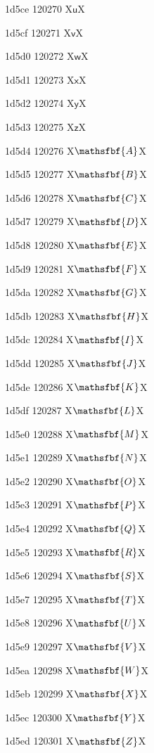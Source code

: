 \documentclass[11pt]{article}
\begin{document}
1d5ce 120270 X{\ensuremath{\mathsf{u}}}X

1d5cf 120271 X{\ensuremath{\mathsf{v}}}X

1d5d0 120272 X{\ensuremath{\mathsf{w}}}X

1d5d1 120273 X{\ensuremath{\mathsf{x}}}X

1d5d2 120274 X{\ensuremath{\mathsf{y}}}X

1d5d3 120275 X{\ensuremath{\mathsf{z}}}X

1d5d4 120276 X{\ensuremath{\mathsfbf{A}}}X

1d5d5 120277 X{\ensuremath{\mathsfbf{B}}}X

1d5d6 120278 X{\ensuremath{\mathsfbf{C}}}X

1d5d7 120279 X{\ensuremath{\mathsfbf{D}}}X

1d5d8 120280 X{\ensuremath{\mathsfbf{E}}}X

1d5d9 120281 X{\ensuremath{\mathsfbf{F}}}X

1d5da 120282 X{\ensuremath{\mathsfbf{G}}}X

1d5db 120283 X{\ensuremath{\mathsfbf{H}}}X

1d5dc 120284 X{\ensuremath{\mathsfbf{I}}}X

1d5dd 120285 X{\ensuremath{\mathsfbf{J}}}X

1d5de 120286 X{\ensuremath{\mathsfbf{K}}}X

1d5df 120287 X{\ensuremath{\mathsfbf{L}}}X

1d5e0 120288 X{\ensuremath{\mathsfbf{M}}}X

1d5e1 120289 X{\ensuremath{\mathsfbf{N}}}X

1d5e2 120290 X{\ensuremath{\mathsfbf{O}}}X

1d5e3 120291 X{\ensuremath{\mathsfbf{P}}}X

1d5e4 120292 X{\ensuremath{\mathsfbf{Q}}}X

1d5e5 120293 X{\ensuremath{\mathsfbf{R}}}X

1d5e6 120294 X{\ensuremath{\mathsfbf{S}}}X

1d5e7 120295 X{\ensuremath{\mathsfbf{T}}}X

1d5e8 120296 X{\ensuremath{\mathsfbf{U}}}X

1d5e9 120297 X{\ensuremath{\mathsfbf{V}}}X

1d5ea 120298 X{\ensuremath{\mathsfbf{W}}}X

1d5eb 120299 X{\ensuremath{\mathsfbf{X}}}X

1d5ec 120300 X{\ensuremath{\mathsfbf{Y}}}X

1d5ed 120301 X{\ensuremath{\mathsfbf{Z}}}X
\end{document}
